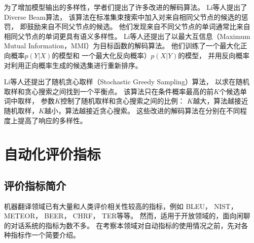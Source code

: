 为了增加模型输出的多样性，学者们提出了许多改进的解码算法。
Li等人提出了Diverse Beam算法，
该算法在标准集束搜索中加入对来自相同父节点的候选的惩罚，
即鼓励来自不同父节点的候选。
他们发现来自不同父节点的单词通常比来自相同父节点的单词更具有语义多样性。
Li等人还提出了以最大互信息（Maximum Mutual Information，MMI）为目标函数的解码算法。
他们训练了一个最大化正向概率$p(Y|X)$的模型和
一个最大化反向概率）$p(X|Y)$的模型，
并用反向概率对利用正向概率生成的候选集进行重新排序。

Li等人还提出了随机贪心取样（Stochastic Greedy Sampling）算法，
以求在随机取样和贪心搜索之间找到一个平衡点。
该算法只在条件概率最高的前$K$个候选单词中取样，
参数$K$控制了随机取样和贪心搜索之间的比例：
$K$越大，算法越接近随机取样，$K$越小，算法越接近贪心搜索。
这些改进的解码算法在分别在不同程度上提高了响应的多样性。

\section{自动化评价指标}\label{sec:automatic_metric}
\subsection{评价指标简介}\label{subsec:metrics_intro}
机器翻译领域已有大量和人类评价相关性较高的指标，例如
BLEU，
NIST，
METEOR，
BEER，
CHRF，
TER等等。
然而，适用于开放领域的，面向闲聊的对话系统的指标为数不多。
在考察本领域对自动指标的使用情况之前，先对各种指标作一个简要介绍。

